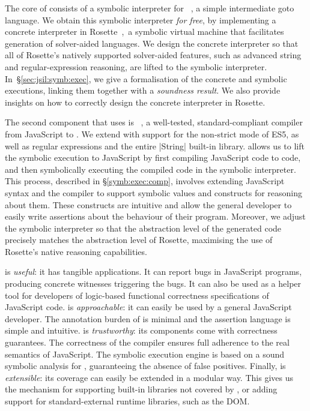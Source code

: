 The core of \cosette consists of a symbolic interpreter for
\jsil~\cite{javert}, a simple intermediate goto language. 
We obtain this symbolic interpreter \emph{for free}, 
by implementing a concrete \jsil interpreter in Rosette~\cite{Rosette2,Rosette1},~a 
symbolic virtual machine that facilitates generation of solver-aided languages.
We design the concrete interpreter so that all of Rosette's natively supported solver-aided
features, such as advanced string and regular-expression reasoning, 
are lifted to the \jsil symbolic interpreter. 
In~\S\ref{sec:jsil:symb:exec}, we give a formalisation of the \jsil concrete and symbolic executions, linking them together with a {\em soundness result}. We also provide insights on how to correctly design the concrete \jsil interpreter in Rosette.


The second component that \cosette uses is \JSComp~\cite{javert}, 
a well-tested, standard-compliant compiler from JavaScript to \jsil. We extend
\JSComp with support for the non-strict mode of ES5, as well as
regular expressions and the entire \jsinline|String| built-in library.
\JSComp allows us to lift the \jsil symbolic execution to JavaScript by first compiling JavaScript code to \jsil code, and
then symbolically executing the compiled code in the 
\jsil symbolic interpreter. This process, described in \S\ref{symb:exec:comp},
involves extending JavaScript syntax and the \JSComp compiler to support symbolic values and 
constructs for reasoning about them. These constructs are intuitive
and allow the general developer to easily write assertions about the behaviour
of their program. 
Moreover, we adjust the \jsil symbolic interpreter so that the abstraction level 
of the generated \jsil code precisely matches the abstraction level of Rosette, 
 maximising the use of Rosette's native reasoning capabilities.


\cosette is \emph{useful}: it has tangible applications. 
It can report bugs in JavaScript programs, producing concrete witnesses triggering the bugs. It can also be used as a helper tool for developers of logic-based functional correctness specifications of JavaScript code.
\cosette is \emph{approachable}: it can easily be used by a general JavaScript developer. The annotation burden of \cosette is minimal and the assertion language is simple and intuitive. 
\cosette is \emph{trustworthy}: its components come with correctness guarantees. 
The correctness of the \JSComp compiler ensures full adherence to the real semantics of JavaScript. The \cosette symbolic execution engine is based on a sound symbolic
analysis for \jsil, guaranteeing the absence of false positives. 
Finally, \cosette is \emph{extensible}: its coverage can easily be extended in a modular way. This gives us the mechanism for supporting built-in libraries not covered by \JSComp, or adding support for standard-external runtime libraries, such as the DOM.